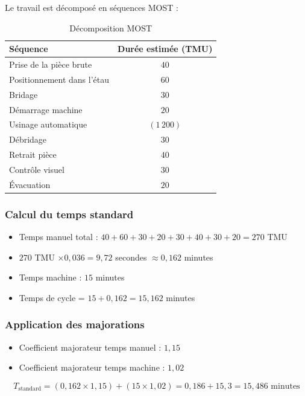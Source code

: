 \documentclass[a4paper,12pt]{article}
\begin{document}
Le travail est décomposé en séquences MOST :

\begin{table}[ht]
\centering
\begin{tabular}{|l|c|}
\hline
\textbf{Séquence} & \textbf{Durée estimée (TMU)} \\
\hline
Prise de la pièce brute & $40$ \\
Positionnement dans l'étau & $60$ \\
Bridage & $30$ \\
Démarrage machine & $20$ \\
Usinage automatique & $(1\,200)$ \\
Débridage & $30$ \\
Retrait pièce & $40$ \\
Contrôle visuel & $30$ \\
Évacuation & $20$ \\
\hline
\end{tabular}
\caption{Décomposition MOST}
\end{table}

\subsubsection{Calcul du temps standard}

\begin{itemize}
    \item Temps manuel total : $40+60+30+20+30+40+30+20 = 270$ TMU
    \item $270$ TMU $\times 0,036 = 9,72$ secondes $\approx 0,162$ minutes
    \item Temps machine : $15$ minutes
    \item Temps de cycle = $15 + 0,162 = 15,162$ minutes
\end{itemize}

\subsubsection{Application des majorations}

\begin{itemize}
    \item Coefficient majorateur temps manuel : $1,15$
    \item Coefficient majorateur temps machine : $1,02$
\end{itemize}

\[
T_{\text{standard}} = (0,162 \times 1,15) + (15 \times 1,02) = 0,186 + 15,3 = 15,486 \text{ minutes}
\]
\end{document}
